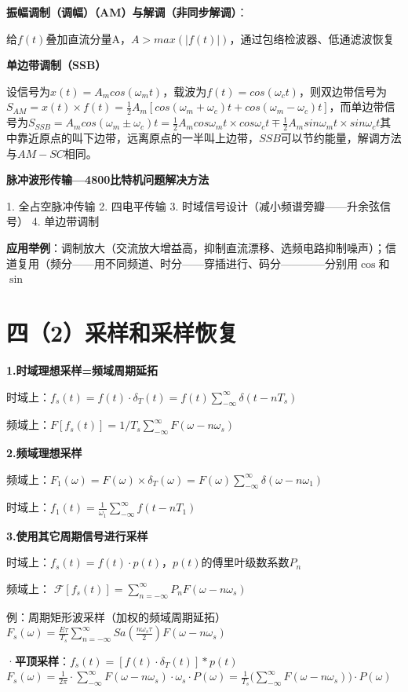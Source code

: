\textbf{振幅调制（调幅）（AM）与解调（非同步解调）}：

给$f(t)$叠加直流分量A，$A>max(|f(t)|)$，通过包络检波器、低通滤波恢复

\textbf{单边带调制（SSB）}

设信号为$x(t)=A_m cos(\omega_m t)$，载波为$f(t)=cos(\omega_c t)$，则双边带信号为$S_{AM}=x(t)\times f(t)=\frac{1}{2} A_m[cos(\omega_m + \omega_c)t + cos(\omega_m - \omega_c)t]$，而单边带信号为$S_{SSB}=A_mcos(\omega_m \pm \omega_c)t=\frac{1}{2} A_mcos\omega_m t \times cos\omega_c t \mp \frac{1}{2} A_m sin \omega_m t \times sin\omega_c t$其中靠近原点的叫下边带，远离原点的一半叫上边带，$SSB$可以节约能量，解调方法与$AM-SC$相同。

\textbf{脉冲波形传输—4800比特机问题解决方法}

1. 全占空脉冲传输    2. 四电平传输    3. 时域信号设计（减小频谱旁瓣——升余弦信号）    4. 单边带调制

\textbf{应用举例}：调制放大（交流放大增益高，抑制直流漂移、选频电路抑制噪声）；信道复用（频分——用不同频道、时分——穿插进行、码分————分别用$\cos$和$\sin$

\section*{四（2）采样和采样恢复}

\textbf{1.时域理想采样=频域周期延拓}

时域上：$f_s(t)\!=\!f(t){\cdot}\delta_T(t)\!=\!f(t)\!\sum_{-\infty}^{\infty}\!\delta(t{-}nT_s)$

频域上：$F[f_s(t)]\!=\!1/T_s\!\sum_{-\infty}^{\infty}\!F(\omega{-}n\omega_s)$


\textbf{2.频域理想采样}

频域上：$F_1(\omega)\!=\!F(\omega){\times}\delta_T(\omega)\!=\!F(\omega)\!\sum_{-\infty}^{\infty}\!\delta(\omega{-}n\omega_1)$

时域上：$f_1(t)\!=\!\frac{1}{\omega_1}\!\sum_{-\infty}^{\infty}\!f(t{-}nT_1)$

\textbf{3.使用其它周期信号进行采样}

时域上：$f_s(t)=f(t)\cdot p(t)$，$p(t)$的傅里叶级数系数$P_n$

频域上： $\mathcal{F}[f_s(t)]=\sum_{n=-\infty}^{\infty}P_nF(\omega-n\omega_s)$

例：周期矩形波采样（加权的频域周期延拓）$F_s(\omega)=\frac{E\tau}{T_s}\sum_{n=-\infty}^{\infty}Sa(\frac{n\omega_s\tau}{2})F(\omega-n\omega_s)$

·\textbf{平顶采样}：$f_s(t)=[f(t){\cdot}\delta_T(t)]*p(t)$\\
$F_s(\omega)=\tfrac{1}{2\pi}{\cdot}\!\sum_{-\infty}^{\infty}\!F(\omega{-}n\omega_s){\cdot}\omega_s{\cdot}P(\omega)=\tfrac{1}{T_s}\biggl(\sum_{-\infty}^{\infty}\!F(\omega{-}n\omega_s)\biggr){\cdot}P(\omega)$

